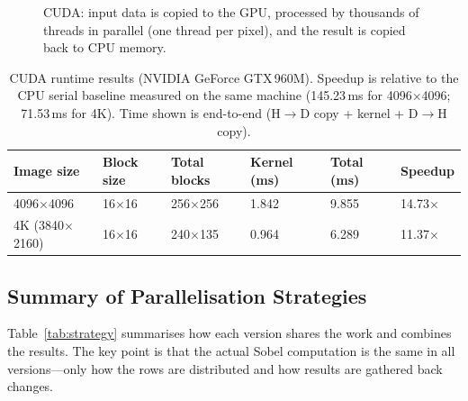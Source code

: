 \documentclass[12pt,a4paper]{article}
\begin{document}
\begin{figure}[H]
{
}%
\caption{CUDA: input data is copied to the GPU, processed by thousands of threads in parallel
  (one thread per pixel), and the result is copied back to CPU memory.}
\label{fig:diag_cuda}
\end{figure}

\begin{table}[H]
\centering
\caption{CUDA runtime results (NVIDIA GeForce GTX\,960M). Speedup is relative
  to the CPU serial baseline measured on the same machine (145.23\,ms for
  4096$\times$4096; 71.53\,ms for 4K). Time shown is end-to-end
  (H$\to$D copy + kernel + D$\to$H copy).}
\label{tab:t_cuda}
\begin{tabular}{@{}llllll@{}}
\toprule
\textbf{Image size} & \textbf{Block size} & \textbf{Total blocks} &
\textbf{Kernel (ms)} & \textbf{Total (ms)} & \textbf{Speedup} \\
\midrule
4096$\times$4096      & 16$\times$16 & 256$\times$256 & 1.842 & 9.855  & 14.73$\times$ \\
4K (3840$\times$2160) & 16$\times$16 & 240$\times$135 & 0.964 & 6.289  & 11.37$\times$ \\
\bottomrule
\end{tabular}
\end{table}

\subsection{Summary of Parallelisation Strategies}
\label{subsec:summary_strategies}

Table~\ref{tab:strategy} summarises how each version shares the work and
combines the results. The key point is that the actual Sobel computation is
the same in all versions---only how the rows are distributed and how results
are gathered back changes.
\end{document}
